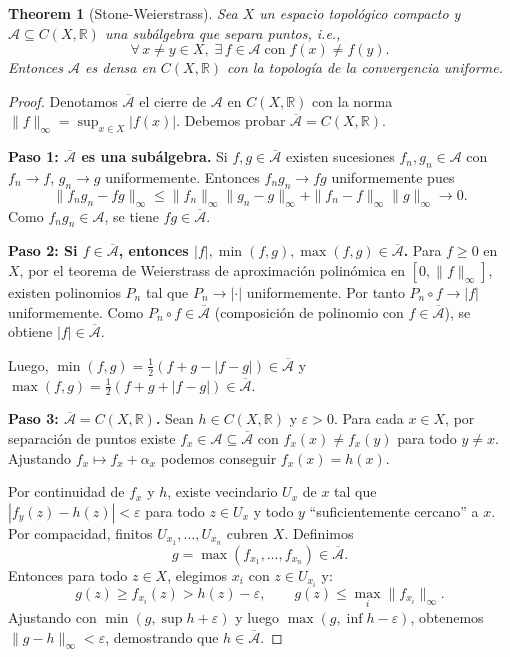 \documentclass[11pt,a4paper]{article}
\theoremstyle{plain}
\newtheorem{theorem}{Theorem}[section]
\theoremstyle{definition}
\begin{document}
\begin{theorem}[Stone-Weierstrass]
Sea $X$ un espacio topológico compacto y $\mathcal{A}\subseteq C(X,\mathbb{R})$ una subálgebra que separa puntos, i.e.,
\[
\forall\,x\neq y\in X,\;\exists\,f\in\mathcal{A}\;\text{con}\;f(x)\neq f(y).
\]
Entonces $\mathcal{A}$ es densa en $C(X,\mathbb{R})$ con la topología de la convergencia uniforme.
\end{theorem}

\begin{proof}
Denotamos $\overline{\mathcal{A}}$ el cierre de $\mathcal{A}$ en $C(X,\mathbb{R})$ con la norma $\|f\|_{\infty}=\sup_{x\in X}|f(x)|$. Debemos probar $\overline{\mathcal{A}}=C(X,\mathbb{R})$.

\textbf{Paso 1: $\overline{\mathcal{A}}$ es una subálgebra.} Si $f,g\in\overline{\mathcal{A}}$ existen sucesiones $f_{n},g_{n}\in\mathcal{A}$ con $f_{n}\to f$, $g_{n}\to g$ uniformemente. Entonces $f_{n}g_{n}\to fg$ uniformemente pues
\[
\|f_{n}g_{n}-fg\|_{\infty}\le \|f_{n}\|_{\infty}\|g_{n}-g\|_{\infty}+\|f_{n}-f\|_{\infty}\|g\|_{\infty}\to 0.
\]
Como $f_{n}g_{n}\in\mathcal{A}$, se tiene $fg\in\overline{\mathcal{A}}$.

\textbf{Paso 2: Si $f\in\overline{\mathcal{A}}$, entonces $|f|,\min(f,g),\max(f,g)\in\overline{\mathcal{A}}$.} Para $f\ge 0$ en $X$, por el teorema de Weierstrass de aproximación polinómica en $[0,\|f\|_{\infty}]$, existen polinomios $P_{n}$ tal que $P_{n}\to |\cdot|$ uniformemente. Por tanto $P_{n}\circ f\to |f|$ uniformemente. Como $P_{n}\circ f\in\overline{\mathcal{A}}$ (composición de polinomio con $f\in\overline{\mathcal{A}}$), se obtiene $|f|\in\overline{\mathcal{A}}$.

Luego, $\min(f,g)=\frac{1}{2}(f+g-|f-g|)\in\overline{\mathcal{A}}$ y $\max(f,g)=\frac{1}{2}(f+g+|f-g|)\in\overline{\mathcal{A}}$.

\textbf{Paso 3: $\overline{\mathcal{A}}=C(X,\mathbb{R})$.} Sean $h\in C(X,\mathbb{R})$ y $\varepsilon>0$. Para cada $x\in X$, por separación de puntos existe $f_{x}\in\mathcal{A}\subseteq\overline{\mathcal{A}}$ con $f_{x}(x)\neq f_{x}(y)$ para todo $y\neq x$. Ajustando $f_{x}\mapsto f_{x}+\alpha_{x}$ podemos conseguir $f_{x}(x)=h(x)$.

Por continuidad de $f_{x}$ y $h$, existe vecindario $U_{x}$ de $x$ tal que $|f_{y}(z)-h(z)|<\varepsilon$ para todo $z\in U_{x}$ y todo $y$ ``suficientemente cercano'' a $x$. Por compacidad, finitos $U_{x_{1}},\dots,U_{x_{n}}$ cubren $X$. Definimos
\[
g=\max(f_{x_{1}},\dots,f_{x_{n}})\in\overline{\mathcal{A}}.
\]
Entonces para todo $z\in X$, elegimos $x_{i}$ con $z\in U_{x_{i}}$ y:
\[
g(z)\ge f_{x_{i}}(z)>h(z)-\varepsilon,\qquad g(z)\le\max_{i}\|f_{x_{i}}\|_{\infty}.
\]
Ajustando con $\min(g,\sup h+\varepsilon)$ y luego $\max(g,\inf h-\varepsilon)$, obtenemos $\|g-h\|_{\infty}<\varepsilon$, demostrando que $h\in\overline{\mathcal{A}}$.
\end{proof}
\end{document}
